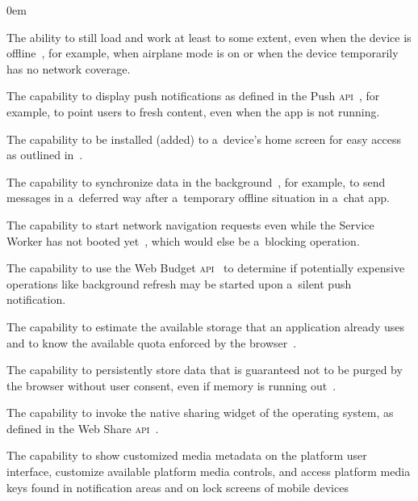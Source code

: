 \documentclass[sigconf]{acmart}
\begin{document}
\begin{description}
  \itemsep0em 
  \item[Offline Capabilities] The ability to still load and work
    at least to some extent, even when the device is offline~\cite{russell2017serviceworkers},
    for example, when airplane mode is on or when the device temporarily has no network coverage.
  \item[Push Notifications] The capability to display push notifications as defined in
    the Push \textsc{api}~\cite{beverloo2017pushapi}, for example,
    to point users to fresh content, even when the app is not running.
  \item[Add to Home Screen] The capability to be installed (added) to a~device's home screen
    for easy access as outlined in~\cite{kinlan2017a2hs}.
  \item[Background Sync] The capability to synchronize data
    in the background~\cite{russell2017serviceworkers},
    for example, to send messages in a~deferred way
    after a~temporary offline situation in a~chat app.
  \item[Navigation Preload] The capability to start network navigation requests
    even while the Service Worker has not booted yet~\cite{archibald2017navigationpreload},
    which would else be a~blocking operation.
  \item[Silent Push] The capability to use the Web Budget
    \textsc{api}~\cite{beverloo2017budgetapi}
    to determine if potentially expensive operations
    like background refresh may be started
    upon a~silent push notification.
  \item[Storage Estimation] The capability to estimate the available storage
    that an application already uses and to know the available quota enforced by the
    browser~\cite{vankesteren2018storage}.
  \item[Persistent Storage] The capability to persistently store data
    that is guaranteed not to be purged by the browser without user consent,
    even if memory is running out~\cite{vankesteren2018storage}.
  \item[Web Share] The capability to invoke the native sharing widget
    of the operating system, as defined in the Web Share \textsc{api}~\cite{giuca2017webshare}.
  \item[Media Session] The capability to show customized media metadata
    on the platform user interface, customize available platform media controls,
    and access platform media keys found in notification areas
    and on lock screens of mobile devices

\end{description}
\end{document}
